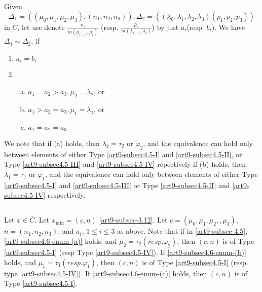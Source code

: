 \subsection{}\label{art9-subsec-4.6}
Given
$$
\Delta_{1} = ((\mu_{0},\mu_{1}, \mu_{2}, \mu_{3}),(n_{1},n_{2}, n_{3})), \Delta_{2} = ((\lambda_{0}, \lambda_{1}, \lambda_{2}, \lambda_{3})(p_{1}, p_{2}, p_{3}))
$$
in $C$, let use denote $\frac{n_{i}}{m(\mu_{i-1}, \mu_{i})}$ (resp. $\frac{p_{i}}{m(\lambda_{i-1}, \lambda_{i})}$) by just $a_{i}$(resp. $b_{i}$).  We have $\Delta_{1} \sim \Delta_{2}$, if
\begin{enumerate}[(1)]
\item $a_{i} =b_{i}$
\item

 \begin{enumerate}[(a)]
    \item $a_{1} = a_{2} > a_{3}, \mu_{2} =\lambda_{2}$, or\label{art9-subsec4.6-enum-(a)}
    \item $a_{1} > a_{2} = a_{3}, \mu_{1} =\lambda_{1}$, or\label{art9-subsec4.6-enum-(b)}
    \item $a_{1} = a_{2} = a_{3}$\label{art9-subsec4.6-enum-(c)}
 \end{enumerate}
\end{enumerate}
We note that if (a) holds, then $\lambda_{2}=\tau_{2}$ or $\varphi_{2}$, and the equivalence can hold only between elements of either Type \ref{art9-subsec4.5-I} and \ref{art9-subsec4.5-II}, or Type \ref{art9-subsec4.5-III} and
\ref{art9-subsec4.5-IV} repectively if (b) holds, then $\lambda_{1}= \tau_{1}$ or $\varphi_{1}$, and the equivalence can  hold only between elements of either Type  \ref{art9-subsec4.5-I} and \ref{art9-subsec4.5-III} or
Type \ref{art9-subsec4.5-II} and \ref{art9-subsec4.5-IV} respectively.

\subsection{}\label{art9-subsec-4.7}
Let $x \in \overline{C}$. Let $ x_{\min} = (\underline{c}, \underline{n})$ \eqref{art9-subsec-3.12}. Let $\underline{c} = (\mu_{0}, \mu_{1}, \mu_{2},,\mu_{3})$, $\underline{n} = (n_{1}, n_{2}, n_{3})$, and $a_{i}$, $1 \leq i \leq 3$ as above. Note that if in \ref{art9-subsec-4.5}, \ref{art9-subsec4.6-enum-(a)} holds, and $\mu_{2} = \tau_{2}(resp.\varphi_{2})$, then $(\underline{c}, \underline{n})$ is of Type \ref{art9-subsec4.5-I} (resp Type \ref{art9-subsec4.5-IV}). If \ref{art9-subsec4.6-enum-(b)} holds, and $\mu_{1} = \tau_{1}(resp.\varphi_{1})$, then $(\underline{c}, \underline{n})$ is of Type \ref{art9-subsec4.5-I} (resp. type \ref{art9-subsec4.5-IV}). If \ref{art9-subsec4.6-enum-(c)} holds, then $(\underline{c}, \underline{n})$ is of Type \ref{art9-subsec4.5-I}. 

